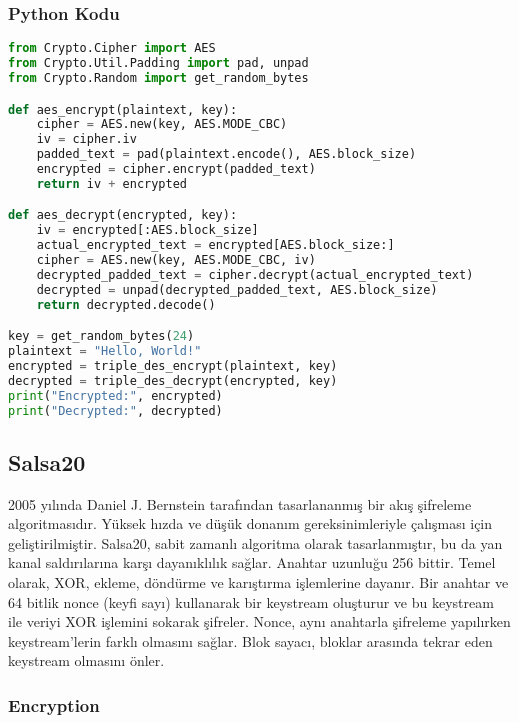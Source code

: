 \subsubsection{Python Kodu}

\begin{lstlisting}[language=Python]
from Crypto.Cipher import AES
from Crypto.Util.Padding import pad, unpad
from Crypto.Random import get_random_bytes

def aes_encrypt(plaintext, key):
    cipher = AES.new(key, AES.MODE_CBC)
    iv = cipher.iv
    padded_text = pad(plaintext.encode(), AES.block_size)
    encrypted = cipher.encrypt(padded_text)
    return iv + encrypted

def aes_decrypt(encrypted, key):
    iv = encrypted[:AES.block_size]
    actual_encrypted_text = encrypted[AES.block_size:]
    cipher = AES.new(key, AES.MODE_CBC, iv)
    decrypted_padded_text = cipher.decrypt(actual_encrypted_text)
    decrypted = unpad(decrypted_padded_text, AES.block_size)
    return decrypted.decode()

key = get_random_bytes(24)
plaintext = "Hello, World!"
encrypted = triple_des_encrypt(plaintext, key)
decrypted = triple_des_decrypt(encrypted, key)
print("Encrypted:", encrypted)
print("Decrypted:", decrypted)
\end{lstlisting}

\newpage

\subsection{Salsa20}

2005 yılında Daniel J. Bernstein tarafından tasarlananmış bir akış şifreleme algoritmasıdır. Yüksek hızda ve düşük donanım gereksinimleriyle çalışması için geliştirilmiştir. Salsa20, sabit zamanlı algoritma olarak tasarlanmıştır, bu da yan kanal saldırılarına karşı dayanıklılık sağlar. Anahtar uzunluğu 256 bittir. Temel olarak, XOR, ekleme, döndürme ve karıştırma işlemlerine dayanır. Bir anahtar ve 64 bitlik nonce (keyfi sayı) kullanarak bir keystream oluşturur ve bu keystream ile veriyi XOR işlemini sokarak şifreler. Nonce, aynı anahtarla şifreleme yapılırken keystream'lerin farklı olmasını sağlar. Blok sayacı, bloklar arasında tekrar eden keystream olmasını önler.

\subsubsection{Encryption}

